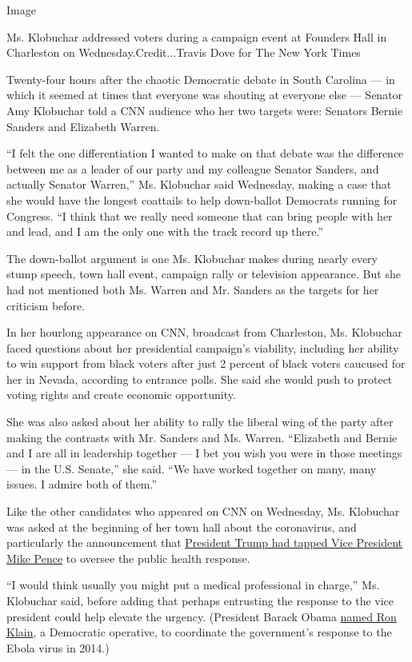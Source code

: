 Image

Ms. Klobuchar addressed voters during a campaign event at Founders Hall
in Charleston on Wednesday.Credit...Travis Dove for The New York Times

Twenty-four hours after the chaotic Democratic debate in South Carolina
--- in which it seemed at times that everyone was shouting at everyone
else --- Senator Amy Klobuchar told a CNN audience who her two targets
were: Senators Bernie Sanders and Elizabeth Warren.

``I felt the one differentiation I wanted to make on that debate was the
difference between me as a leader of our party and my colleague Senator
Sanders, and actually Senator Warren,'' Ms. Klobuchar said Wednesday,
making a case that she would have the longest coattails to help
down-ballot Democrats running for Congress. ``I think that we really
need someone that can bring people with her and lead, and I am the only
one with the track record up there.''

The down-ballot argument is one Ms. Klobuchar makes during nearly every
stump speech, town hall event, campaign rally or television appearance.
But she had not mentioned both Ms. Warren and Mr. Sanders as the targets
for her criticism before.

In her hourlong appearance on CNN, broadcast from Charleston, Ms.
Klobuchar faced questions about her presidential campaign's viability,
including her ability to win support from black voters after just 2
percent of black voters caucused for her in Nevada, according to
entrance polls. She said she would push to protect voting rights and
create economic opportunity.

She was also asked about her ability to rally the liberal wing of the
party after making the contrasts with Mr. Sanders and Ms. Warren.
``Elizabeth and Bernie and I are all in leadership together --- I bet
you wish you were in those meetings --- in the U.S. Senate,'' she said.
``We have worked together on many, many issues. I admire both of them.''

Like the other candidates who appeared on CNN on Wednesday, Ms.
Klobuchar was asked at the beginning of her town hall about the
coronavirus, and particularly the announcement that
\href{https://www.nytimes3xbfgragh.onion/2020/02/26/us/politics/trump-coronavirus-cdc.html}{President
Trump had tapped Vice President Mike Pence} to oversee the public health
response.

``I would think usually you might put a medical professional in
charge,'' Ms. Klobuchar said, before adding that perhaps entrusting the
response to the vice president could help elevate the urgency.
(President Barack Obama
\href{https://www.nytimes3xbfgragh.onion/2014/10/18/us/ebola-cruise-ship-dallas.html}{named
Ron Klain}, a Democratic operative, to coordinate the government's
response to the Ebola virus in 2014.)

